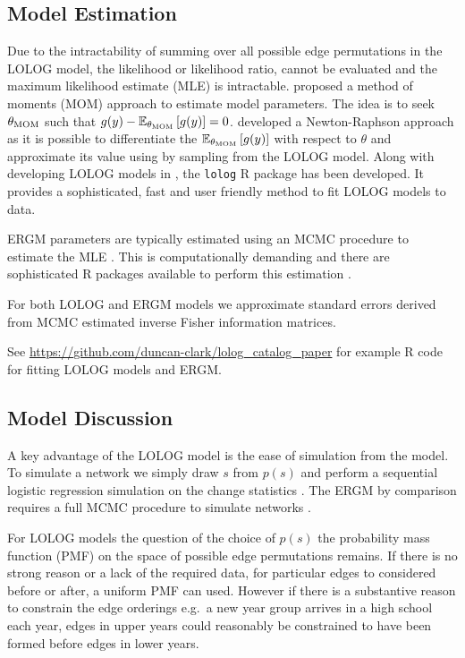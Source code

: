 \documentclass[
]{statsoc}
\begin{document}
\subsection{Model Estimation}

Due to the intractability of summing over all possible edge permutations
in the LOLOG model, the likelihood or likelihood ratio, cannot be
evaluated and the maximum likelihood estimate (MLE) is intractable.
\cite{Fellows2018} proposed a method of moments (MOM) approach to
estimate model parameters. The idea is to seek \(\theta_{{\rm MOM}}\)
such that
\(g(y) - \mathbb{E}_{\theta_{{\rm MOM}}}\left[ g(y) \right] = 0\).
\cite{Fellows2018} developed a Newton-Raphson approach as it is possible
to differentiate the
\(\mathbb{E}_{\theta_{{\rm MOM}}}\left[ g(y) \right]\) with respect to
\(\theta\) and approximate its value using by sampling from the LOLOG
model. Along with developing LOLOG models in \cite{Fellows2018}, the
\texttt{lolog} R package \citep{LOLOG_github} has been developed. It
provides a sophisticated, fast and user friendly method to fit LOLOG
models to data.

ERGM parameters are typically estimated using an MCMC procedure to
estimate the MLE \citep{Snijders2002,Hunter2006}. This is
computationally demanding and there are sophisticated R packages
available to perform this estimation \citep{ergm_3_9_4}.

For both LOLOG and ERGM models we approximate standard errors derived
from MCMC estimated inverse Fisher information matrices.

See \url{https://github.com/duncan-clark/lolog_catalog_paper} for
example R code for fitting LOLOG models and ERGM.

\subsection{Model Discussion}\label{sec:comparison}

A key advantage of the LOLOG model is the ease of simulation from the
model. To simulate a network we simply draw \(s\) from \(p(s)\) and
perform a sequential logistic regression simulation on the change
statistics \citep{LOLOG_github}. The ERGM by comparison requires a full
MCMC procedure to simulate networks \citep{ergm_3_9_4}.

For LOLOG models the question of the choice of \(p(s)\) the probability
mass function (PMF) on the space of possible edge permutations remains.
If there is no strong reason or a lack of the required data, for
particular edges to considered before or after, a uniform PMF can used.
However if there is a substantive reason to constrain the edge orderings
e.g.~a new year group arrives in a high school each year, edges in upper
years could reasonably be constrained to have been formed before edges
in lower years.
\end{document}
